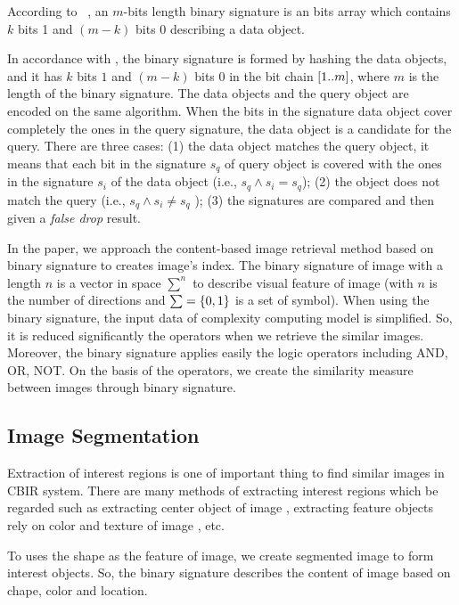\documentclass{amcs}
\begin{document}
According to ~\cite{}, an $m$-bits length binary signature is an bits array which contains $k$ bits 1 and $(m-k)$ bits 0 describing a data object.  



In accordance with \cite{Chen:06}, the binary signature is formed by hashing the data objects, and it has $k$ bits $1$ and $(m - k)$ bits $0$ in the bit chain $[1..m{\rm{]}}$, where $m$ is the length of the binary signature. The data objects and the query object are encoded on the same algorithm. When the bits in the signature data object cover completely the ones in the query signature, the data object is a candidate for the query. There are three cases: (1) the data object matches the query object, it means that each bit in the signature ${s_q}$ of query object is covered with the ones in the signature ${s_i}$ of the data object (i.e., ${s_q} \wedge {s_i} = {s_q}$); (2) the object does not match the query (i.e., ${s_q} \wedge {s_i} \ne {s_q}$ ); (3) the signatures are compared and then given a \textit{false drop} result.

In the paper, we approach the content-based image retrieval method based on binary signature to creates image's index. The binary signature of image with a length $n$ is a vector in space ${\sum ^n}$ to describe visual feature of image (with $n$ is the number of directions and $\sum  = \{ 0,{\rm{ }}1\} $ is a set of symbol). When using the binary signature, the input data of complexity computing model is simplified. So, it is reduced significantly the operators when we retrieve the similar images. Moreover, the binary signature applies easily the logic operators including AND, OR, NOT. On the basis of the operators, we create the similarity measure between images through binary signature.

\subsection{Image Segmentation}
Extraction of interest regions is one of important thing to find similar images in CBIR system. There are many methods of extracting interest regions which be regarded such as extracting center object of image \cite{Kim:2003}, extracting feature objects rely on color and texture of image \cite{Yoo:02}, etc.

To uses the shape as the feature of image, we create segmented image to form interest objects. So, the binary signature describes the content of image based on chape, color and location.
\end{document}
